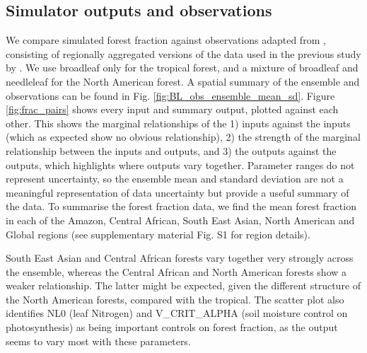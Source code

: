 \documentclass[esd, article]{copernicus} %
\begin{document}
\subsection{Simulator outputs and observations}\label{inputsoutputs}
We compare simulated forest fraction against observations adapted from \cite{loveland2000landcover}, consisting of regionally aggregated versions of the data used in the previous study by \cite{williams2013optimising}. We use broadleaf only for the tropical forest, and a mixture of broadleaf and needleleaf for the North American forest. A spatial summary of the ensemble and observations can be found in Fig. \ref{fig:BL_obs_ensemble_mean_sd}. Figure \ref{fig:frac_pairs} shows every input and summary output, plotted against each other. This shows the marginal relationships of the 1) inputs against the inputs (which as expected show no obvious relationship), 2) the strength of the marginal relationship between the inputs and outputs, and 3) the outputs against the outputs, which highlights where outputs vary together. Parameter ranges do not represent uncertainty, so the ensemble mean and standard deviation are not a meaningful representation of data uncertainty but provide a useful summary of the data. To summarise the forest fraction data, we find the mean forest fraction in each of the Amazon, Central African, South East Asian, North American and Global regions (see supplementary material Fig. S1 for region details).

South East Asian and Central African forests vary together very strongly across the ensemble, whereas the Central African and North American forests show a weaker relationship. The latter might be expected, given the different structure of the North American forests, compared with the tropical. The scatter plot also identifies NL0 (leaf Nitrogen) and V\_CRIT\_ALPHA (soil moisture control on photosynthesis) as being important controls on forest fraction, as the output seems to vary most with these parameters.

%


\end{document}
